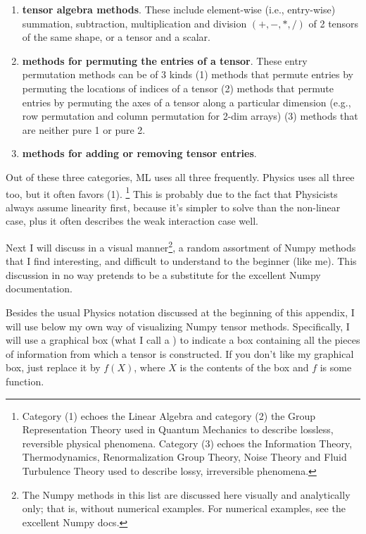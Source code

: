 \begin{enumerate}

\item {\bf tensor algebra methods}. These include
element-wise (i.e., entry-wise) summation, subtraction, multiplication and
division $(+,-,*,/)$ of 2 tensors of the same shape, or a tensor and a scalar.

\item
{\bf methods
for permuting  the entries of a tensor}. These
 entry permutation methods
 can be of 3 kinds
 (1) methods that
 permute entries by permuting the  locations of indices of a tensor
 (2) methods  that
 permute entries by permuting the  axes
 of a tensor along
 a particular dimension
 (e.g., row permutation and column permutation for 2-dim arrays)
(3) methods that
are neither pure 1 or pure 2.

\item {\bf methods for adding or
removing tensor entries}.
\end{enumerate}
Out of these three categories, ML uses all three frequently.  Physics uses all three too, but it often favors (1). \footnote{
Category (1) echoes the Linear Algebra and category (2) the Group Representation Theory used in Quantum Mechanics to describe lossless, reversible physical phenomena. Category (3) echoes the Information Theory, Thermodynamics, Renormalization Group Theory, Noise Theory and Fluid Turbulence Theory used to describe lossy, irreversible phenomena.} This is
probably due to the fact
that Physicists always assume linearity  first, because it's  simpler to solve than the non-linear case, plus it often describes the weak interaction case well.

Next I will discuss in a visual manner\footnote{The Numpy methods in this list are discussed here visually and analytically only; that is, without numerical examples. For numerical examples, see the excellent Numpy docs.}, a random
assortment of Numpy
methods that I find interesting, and difficult to understand to the beginner (like me). This discussion in no way pretends to be
a substitute for the excellent Numpy documentation.

Besides the usual Physics notation
discussed at the beginning of this appendix, I will
use below my own way of visualizing Numpy tensor methods. Specifically, I will
use a graphical box (what I call a ) to indicate
a box containing all the pieces of information
from which a tensor is constructed.
If you don't like my graphical box,
just replace it by $f(X)$,
where $X$ is the contents of the box and
$f$ is some function.


